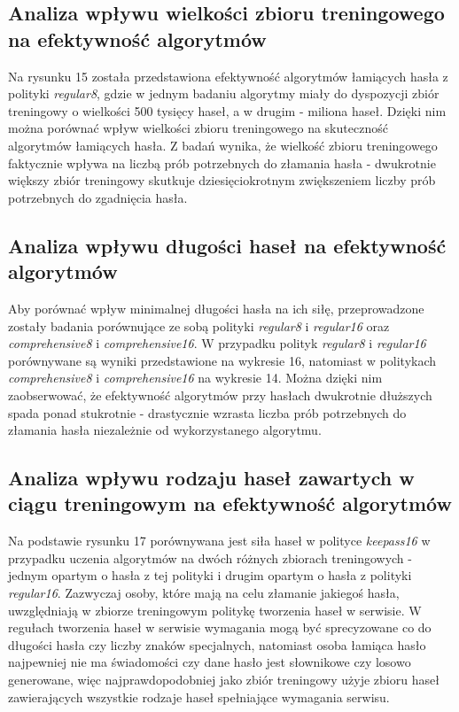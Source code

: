 \documentclass{article}
\begin{document}
	\subsection{Analiza wpływu wielkości zbioru treningowego na efektywność algorytmów}
		Na rysunku 15 została przedstawiona efektywność algorytmów łamiących hasła z polityki \textit{regular8}, gdzie w jednym
		badaniu algorytmy miały do dyspozycji zbiór treningowy o wielkości 500 tysięcy haseł, a w drugim - miliona haseł. Dzięki nim
		można porównać wpływ wielkości zbioru treningowego na skuteczność algorytmów łamiących hasła. Z badań wynika, że wielkość zbioru
		treningowego faktycznie wpływa na liczbą prób potrzebnych do złamania hasła - dwukrotnie większy zbiór treningowy skutkuje
		dziesięciokrotnym zwiększeniem liczby prób potrzebnych do zgadnięcia hasła.

	\subsection{Analiza wpływu długości haseł na efektywność algorytmów}
		Aby porównać wpływ minimalnej długości hasła na ich siłę, przeprowadzone zostały badania porównujące ze sobą polityki
		\textit{regular8} i \textit{regular16} oraz \textit{comprehensive8} i \textit{comprehensive16}.
		W przypadku polityk \textit{regular8} i \textit{regular16} porównywane są wyniki przedstawione na wykresie 16,
		natomiast w politykach \textit{comprehensive8} i \textit{comprehensive16} na wykresie 14.
		Można dzięki nim zaobserwować, że efektywność algorytmów przy hasłach dwukrotnie dłuższych spada ponad stukrotnie -
		drastycznie wzrasta liczba prób potrzebnych do złamania hasła niezależnie od wykorzystanego algorytmu.

	\subsection{Analiza wpływu rodzaju haseł zawartych w ciągu treningowym na efektywność algorytmów}
		Na podstawie rysunku 17 porównywana jest siła haseł w polityce \textit{keepass16} w przypadku uczenia algorytmów
	na dwóch różnych zbiorach treningowych - jednym opartym o hasła z tej polityki i drugim opartym o hasła z polityki \textit{regular16}.
	Zazwyczaj osoby, które mają na celu złamanie jakiegoś hasła, uwzględniają w zbiorze treningowym politykę tworzenia haseł w serwisie.
	W regułach tworzenia haseł w serwisie wymagania mogą być sprecyzowane co do długości hasła czy liczby znaków specjalnych,
	natomiast osoba łamiąca hasło najpewniej nie ma świadomości czy dane hasło jest słownikowe czy losowo generowane,
	więc najprawdopodobniej jako zbiór treningowy użyje zbioru haseł zawierających wszystkie rodzaje haseł spełniające wymagania serwisu.
\end{document}
